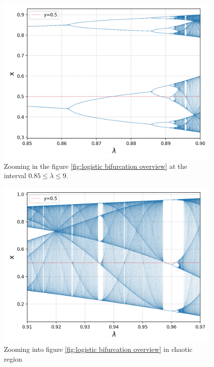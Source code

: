 \begin{figure}[htbp]
	\centering
	\includegraphics[width=\textwidth]{./figures/l_bifurcation_zoom_2.png}
	\caption{Zooming in the figure \ref{fig:logistic bifurcation overview} at the interval $0.85 \leq \lambda \leq 9$.}
	\label{fig:logistic_bifurcation_zoom_2}
\end{figure}

\begin{figure}[htbp]
	\centering
	\includegraphics[width=\textwidth]{./figures/l_bifurcation_zoom_3.png}
	\caption{Zooming into figure \ref{fig:logistic bifurcation overview} in chaotic region}
	\label{fig:logistic_bifurcation_zoom_3}
\end{figure}

